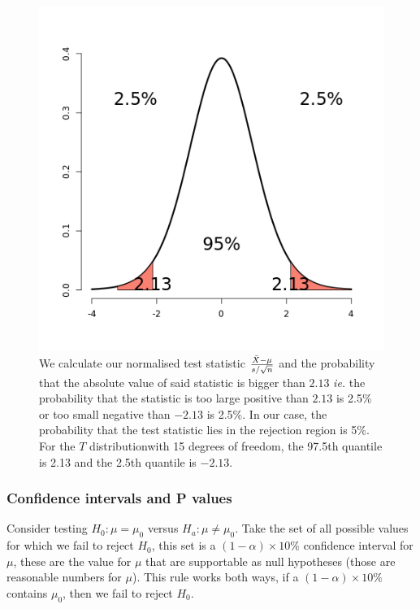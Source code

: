 \documentclass{homework}
\begin{document}
\begin{figure}
    \centering
    \includegraphics[scale=0.4]{figs/two sided T test.png}
    \caption{We calculate our normalised test statistic $\frac{\Bar{X}-\mu}{s/\sqrt{n}}$ and the probability that the absolute value of said statistic is bigger than $2.13$ \textit{ie.} the probability that the statistic is too large positive than $2.13$ is 2.5\% or too small negative than $-2.13$ is 2.5\%. In our case, the probability that the test statistic lies in the rejection region is 5\%. For the $T$ distributionwith 15 degrees of freedom, the 97.5th quantile is 2.13 and the 2.5th quantile is $-2.13$. }
    \label{fig: two sided Student's T test}
\end{figure}

\subsubsection{Confidence intervals and P values}

Consider testing $H_0 : \mu = \mu_0$ versus $H_a : \mu \neq \mu_0$. Take the set of all possible values for which we fail to reject $H_0$, this set is a $(1-\alpha)\times 10\%$ confidence interval for $\mu$, these are the value for $\mu$ that are supportable as null hypotheses (those are reasonable numbers for $\mu$). This rule works both ways, if a $(1-\alpha)\times 10\%$ contains $\mu_0$, then we fail to reject $H_0$.
\end{document}
